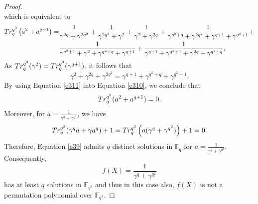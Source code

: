 \documentclass[10pt,a4paper]{amsart}
\def\Tr{{\rm Tr}}
\newcommand{\F}{\mathbb F}
\begin{document}
\begin{proof}
\begin{equation*}
\end{equation*}
which is equivalent to
\begin{equation}\label{e310}
\begin{split}
\Tr_{q}^{q^3}\left(a^2+a^{q+1}\right)=&
\frac{1}{\gamma^{2q}+\gamma^{2q^2}}+\frac{1}{\gamma^{2q^2}+\gamma^{2}}+\frac{1}{\gamma^{2}+\gamma^{2q}}+\frac{1}{\gamma^{q^2+q}+\gamma^{2q^2}+\gamma^{q+1}+\gamma^{q^2+1}}+\\&\frac{1}{\gamma^{q^2+1}+\gamma^{2}+\gamma^{q^2+q}+\gamma^{q+1}}+\frac{1}{\gamma^{q+1}+\gamma^{q^2+1}+\gamma^{2q}+\gamma^{q^2+q}}.
\end{split}
\end{equation}
As $\Tr_{q}^{q^3}(\gamma^2)=\Tr_{q}^{q^3}(\gamma^{q+1})$, it follows that 
\begin{equation}\label{e311}
    \gamma^2+\gamma^{2q}+\gamma^{2q^2}=\gamma^{q+1}+\gamma^{q^2+q}+\gamma^{q^2+1}.
\end{equation}
By using Equation \eqref{e311} into Equation \eqref{e310}, we conclude that
$$\Tr_{q}^{q^3}(a^2+a^{q+1})=0.$$
Moreover, for $a=\frac{1}{\gamma^q+\gamma^{q^2}}$, we have 
$$\Tr_{q}^{q^3}(\gamma^qa+\gamma a^q)+1=\Tr_{q}^{q^3}\left(a(\gamma^q+\gamma^{q^2})\right)+1=0.$$  Therefore, Equation \eqref{e39} admits $q$ distinct solutions in $\F_q$ for $a=\frac{1}{\gamma^q+\gamma^{q^2}}.$ Consequently, $$f(X)=\frac{1}{\gamma^q+\gamma^{q^2}}$$ has at least $q$ solutions in $\F_{q^3}$ and thus in this case also, $f(X)$ is not a permutation polynomial over $\F_{q^3}.$

\end{proof}
\end{document}
